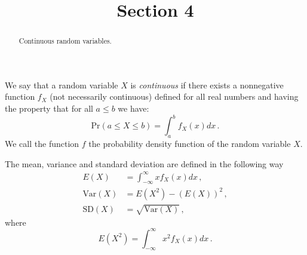\documentclass{ximera}
\title{Section 4}
\begin{document}
\begin{abstract}
Continuous random variables.
\end{abstract}
\maketitle

We say that a random variable $X$ is {\it continuous} if there exists a nonnegative function $f_{X}$ (not necessarily continuous) defined for all real numbers and having the property that for all $a\leq b$ we have:
$$ \text{Pr}( a \leq X \leq b) = \int_{a}^{b} f_{X}(x)dx \,. $$
We call the function $f$ the probability density function of the random variable $X$.\vspace{.25cm}

The mean, variance and standard deviation are defined in the following way
\begin{align*}
E(X) &= \int_{-\infty}^{\infty} xf_{X}(x)dx\,,  \\
\text{Var}(X) &= E(X^{2}) - (E(X))^{2}\,, \\
\text{SD}(X) &= \sqrt{\text{Var}(X)}\,,
\end{align*}
where
$$ E(X^{2}) = \int_{-\infty}^{\infty} x^{2}f_{X}(x)dx\,.  $$
\end{document}
